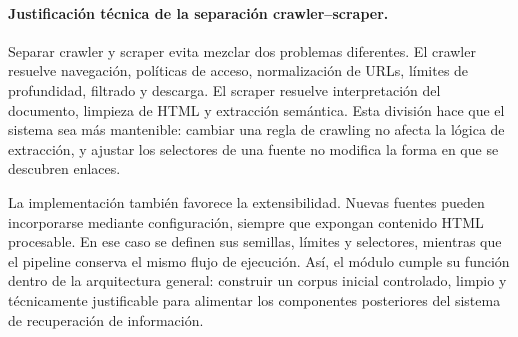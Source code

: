 \documentclass[11pt]{article}
\begin{document}
\paragraph{Justificación técnica de la separación crawler--scraper.}
Separar crawler y scraper evita mezclar dos problemas diferentes. El crawler resuelve navegación,
políticas de acceso, normalización de URLs, límites de profundidad, filtrado y descarga. El
scraper resuelve interpretación del documento, limpieza de HTML y extracción semántica. Esta
división hace que el sistema sea más mantenible: cambiar una regla de crawling no afecta la lógica
de extracción, y ajustar los selectores de una fuente no modifica la forma en que se descubren
enlaces.

La implementación también favorece la extensibilidad. Nuevas fuentes pueden incorporarse
mediante configuración, siempre que expongan contenido HTML procesable. En ese caso se definen
sus semillas, límites y selectores, mientras que el pipeline conserva el mismo flujo de ejecución.
Así, el módulo cumple su función dentro de la arquitectura general: construir un corpus inicial
controlado, limpio y técnicamente justificable para alimentar los componentes posteriores del
sistema de recuperación de información.
\end{document}
